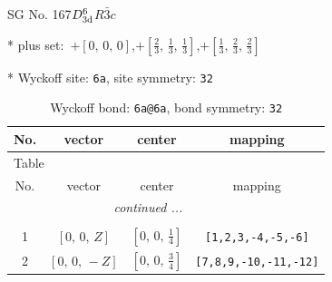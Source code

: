 \documentclass[fleqn,8pt]{jsarticle}
\begin{document}
\setcounter{MaxMatrixCols}{32}

\renewcommand{\tablename}{Table~}
\renewcommand{\figurename}{Figure~}
\begin{center}
\LARGE
SG No. 167\quad$D_{\rm 3d}^{6}$\quad$R\bar{3}c$\quad[ trigonal ]
\end{center}

* plus set:\,\,\,$+\left[ 0,\, 0,\, 0 \right]$,\quad $+\left[ \frac{2}{3},\, \frac{1}{3},\, \frac{1}{3} \right]$,\quad $+\left[ \frac{1}{3},\, \frac{2}{3},\, \frac{2}{3} \right]$


* Wyckoff site: {\tt 6a}, site symmetry: {\tt 32}
\renewcommand{\arraystretch}{1.2}
\begin{longtable}{cccc}
\caption{Wyckoff bond: {\tt 6a@6a}, bond symmetry: {\tt 32}}
 \\
 \hline \hline
No. & vector & center & mapping \\ \hline \endfirsthead

\multicolumn{3}{l}{\tablename\ \thetable{}} \\
 \hline \hline
No. & vector & center & mapping \\ \hline \endhead

 \hline \hline
\multicolumn{3}{r}{\footnotesize\it continued ...} \\ \endfoot

 \hline \hline
\multicolumn{3}{r}{} \\ \endlastfoot

1 & $\left[ 0,\, 0,\, Z \right]$ & $\left[ 0,\, 0,\, \frac{1}{4} \right]$ & {\tt [1,2,3,-4,-5,-6]} \\ \hline
2 & $\left[ 0,\, 0,\, - Z \right]$ & $\left[ 0,\, 0,\, \frac{3}{4} \right]$ & {\tt [7,8,9,-10,-11,-12]} \\
\end{longtable}
\renewcommand{\arraystretch}{1.2}
\end{document}
